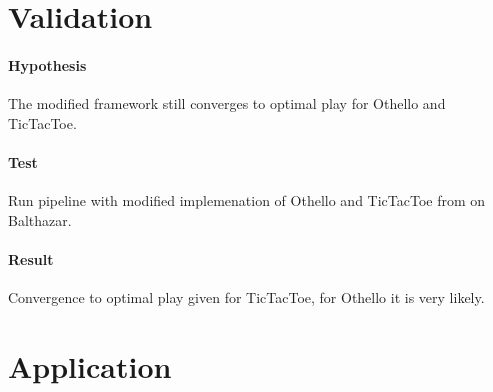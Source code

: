 \section{Validation}
\paragraph{Hypothesis} The modified framework still converges to optimal play for Othello and TicTacToe.
\paragraph{Test} Run pipeline with modified implemenation of Othello and TicTacToe from \cite{thakoor_suragnairalpha-zero-general_nodate} on Balthazar.
\paragraph{Result} Convergence to optimal play given for TicTacToe, for Othello it is very likely.

\section{Application}
